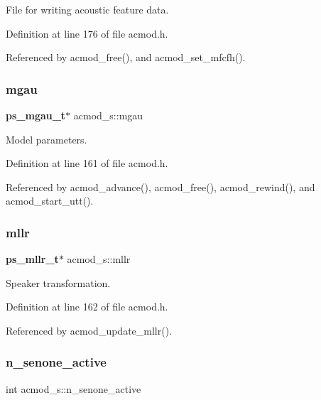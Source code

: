 File for writing acoustic feature data. 



Definition at line 176 of file acmod.\+h.



Referenced by acmod\+\_\+free(), and acmod\+\_\+set\+\_\+mfcfh().

\mbox{\label{structacmod__s_a023addd9fe7252d87c683e02485cdafd}} 
\subsubsection{mgau}
{\footnotesize\ttfamily \textbf{ ps\+\_\+mgau\+\_\+t}$\ast$ acmod\+\_\+s\+::mgau}



Model parameters. 



Definition at line 161 of file acmod.\+h.



Referenced by acmod\+\_\+advance(), acmod\+\_\+free(), acmod\+\_\+rewind(), and acmod\+\_\+start\+\_\+utt().

\mbox{\label{structacmod__s_a4edbfa1a1324c6db27b74de7d0158e5e}} 
\subsubsection{mllr}
{\footnotesize\ttfamily \textbf{ ps\+\_\+mllr\+\_\+t}$\ast$ acmod\+\_\+s\+::mllr}



Speaker transformation. 



Definition at line 162 of file acmod.\+h.



Referenced by acmod\+\_\+update\+\_\+mllr().

\mbox{\label{structacmod__s_a5081a507e3ca6de6c5695217245dc9f9}} 
\subsubsection{n\+\_\+senone\+\_\+active}
{\footnotesize\ttfamily int acmod\+\_\+s\+::n\+\_\+senone\+\_\+active}



